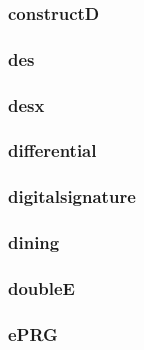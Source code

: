 \begin{frame}\frametitle{constructD}
\begin{figure}
\begin{center}

\end{center}
\end{figure}
\end{frame}
\begin{frame}\frametitle{des}
\begin{figure}
\begin{center}

\end{center}
\end{figure}
\end{frame}
\begin{frame}\frametitle{desx}
\begin{figure}
\begin{center}

\end{center}
\end{figure}
\end{frame}
\begin{frame}\frametitle{differential}
\begin{figure}
\begin{center}

\end{center}
\end{figure}
\end{frame}
\begin{frame}\frametitle{digitalsignature}
\begin{figure}
\begin{center}

\end{center}
\end{figure}
\end{frame}
\begin{frame}\frametitle{dining}
\begin{figure}
\begin{center}

\end{center}
\end{figure}
\end{frame}
\begin{frame}\frametitle{doubleE}
\begin{figure}
\begin{center}

\end{center}
\end{figure}
\end{frame}
\begin{frame}\frametitle{ePRG}
\begin{figure}
\begin{center}

\end{center}
\end{figure}
\end{frame}
